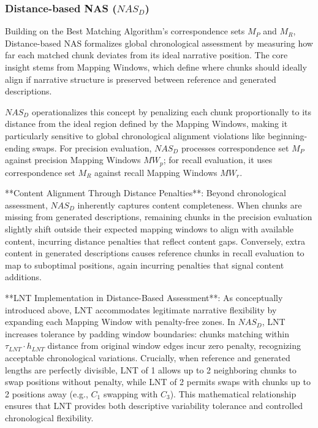 \documentclass[main.tex]{subfiles}
\begin{document}
\subsubsection{Distance-based NAS ($NAS_D$)}
Building on the Best Matching Algorithm's correspondence sets $M_P$ and $M_R$, Distance-based NAS formalizes global chronological assessment by measuring how far each matched chunk deviates from its ideal narrative position. The core insight stems from Mapping Windows, which define where chunks should ideally align if narrative structure is preserved between reference and generated descriptions.

$NAS_D$ operationalizes this concept by penalizing each chunk proportionally to its distance from the ideal region defined by the Mapping Windows, making it particularly sensitive to global chronological alignment violations like beginning-ending swaps. For precision evaluation, $NAS_D$ processes correspondence set $M_P$ against precision Mapping Windows $MW_p$; for recall evaluation, it uses correspondence set $M_R$ against recall Mapping Windows $MW_r$.

**Content Alignment Through Distance Penalties**: Beyond chronological assessment, $NAS_D$ inherently captures content completeness. When chunks are missing from generated descriptions, remaining chunks in the precision evaluation slightly shift outside their expected mapping windows to align with available content, incurring distance penalties that reflect content gaps. Conversely, extra content in generated descriptions causes reference chunks in recall evaluation to map to suboptimal positions, again incurring penalties that signal content additions.

**LNT Implementation in Distance-Based Assessment**: As conceptually introduced above, LNT accommodates legitimate narrative flexibility by expanding each Mapping Window with penalty-free zones. In $NAS_D$, LNT increases tolerance by padding window boundaries: chunks matching within $\tau_{LNT} \cdot h_{LNT}$ distance from original window edges incur zero penalty, recognizing acceptable chronological variations. Crucially, when reference and generated lengths are perfectly divisible, LNT of 1 allows up to 2 neighboring chunks to swap positions without penalty, while LNT of 2 permits swaps with chunks up to 2 positions away (e.g., $C_1$ swapping with $C_3$). This mathematical relationship ensures that LNT provides both descriptive variability tolerance and controlled chronological flexibility.
\end{document}
